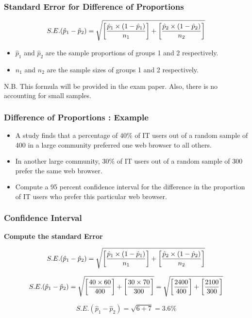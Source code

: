 \documentclass[a4]{beamer}
\begin{document}

\begin{frame}
\frametitle{Standard Error for Difference of Proportions}

\[ S.E. (\hat{p}_1 - \hat{p}_2) =
\sqrt{ \left[{\hat{p}_1 \times (1 - \hat{p}_1) \over n_1}\right] + \left[{\hat{p}_2 \times (1 - \hat{p}_2) \over n_2}\right] } \]
\begin{itemize}
\item $\hat{p}_1$ and $\hat{p}_2$ are the sample proportions of groups 1 and 2 respectively.
\item $n_1$ and $n_2$ are the sample sizes of groups 1 and 2 respectively.
\end{itemize}
N.B. This formula will be provided in the exam paper. Also, there is no accounting for small samples.
\end{frame}

\begin{frame}
\frametitle{ Difference of Proportions : Example}
\begin{itemize} \item
A study finds that a percentage of $40\%$ of IT users out of a random sample of 400 in a large
community preferred one web browser to all others. \item In another large community, $30\%$ of IT users out of a random sample
of 300 prefer the same web browser. \item Compute a 95 percent confidence interval for the difference in the proportion of IT users who prefer this particular web browser. \end{itemize}
\end{frame}


\begin{frame}
\frametitle{Confidence Interval}
\textbf{Compute the standard Error}

\[ S.E. (\hat{p}_1 - \hat{p}_2) =
\sqrt{ \left[{\hat{p}_1 \times (1 - \hat{p}_1) \over n_1}\right] + \left[{\hat{p}_2 \times (1 - \hat{p}_2) \over n_2}\right] } \]

\[ S.E. (\hat{p}_1 - \hat{p}_2) =
\sqrt{ \left[{40 \times 60 \over 400}\right] + \left[{30 \times 70 \over 300}\right] }  = \sqrt{ \left[{2400 \over 400}\right] + \left[{2100\over 300}\right] } \]

\[ S.E. (\hat{p}_1 - \hat{p}_2)
= \sqrt{ 6 + 7 } = 3.6\% \]

\end{frame}
\end{document}
